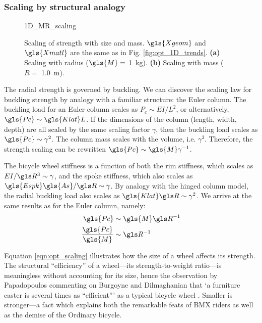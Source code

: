 \documentclass[\rootdir/thesis.tex]{subfiles}
\begin{document}
\subsubsection*{Scaling by structural analogy}

\begin{figure}
\centering
{1D_MR_scaling}
\caption[Scaling laws for radial strength]{Scaling of strength with size and mass. $\gls{Xgeom}$ and $\gls{Xmatl}$ are the same as in Fig. \ref{fig:opt_1D_trends}. \textbf{(a)} Scaling with radius ($\gls{M}=$ \SI{1}{kg}). \textbf{(b)} Scaling with mass ($R=$ \SI{1.0}{m}).}
\label{fig:opt_1D_scaling}
\end{figure}

The radial strength is governed by buckling. We can discover the scaling law for buckling strength by analogy with a familiar structure: the Euler column. The buckling load for an Euler column scales as $P_c \sim EI/L^2$, or alternatively, $\gls{Pc} \sim \gls{Klat} L$. If the dimensions of the column (length, width, depth) are all scaled by the same scaling factor $\gamma$, then the buckling load scales as $\gls{Pc} \sim \gamma^2$. The column mass scales with the volume, i.e. $\gamma^3$. Therefore, the strength scaling can be rewritten $\gls{Pc} \sim \gls{M} \gamma^{-1}$.

The bicycle wheel stiffness is a function of both the rim stiffness, which scales as $EI/\R^3 \sim \gamma$, and the spoke stiffness, which also scales as $\gls{Espk}\gls{As}/\R \sim \gamma$. By analogy with the hinged column model, the radial buckling load also scales as $\gls{Klat}\R \sim \gamma^2$. We arrive at the same results as for the Euler column, namely:
\begin{subequations}
\label{eqn:opt_scaling}
\begin{align}
\gls{Pc}                 & \sim \gls{M} \R^{-1}\\
\frac{\gls{Pc}}{\gls{M}} & \sim \R^{-1}
\end{align}
\end{subequations}

Equation \eqref{eqn:opt_scaling} illustrates how the size of a wheel affects its strength. The structural ``efficiency'' of a wheel---its strength-to-weight ratio---is meaningless without accounting for its size, hence the observation by Papadopoulos commenting on Burgoyne and Dilmaghanian \cite{Burgoyne1993} that `a furniture caster is several times as ``efficient''' as a typical bicycle wheel \cite{Papadopoulos1995}. Smaller is stronger---a fact which explains both the remarkable feats of BMX riders as well as the demise of the Ordinary bicycle.
\end{document}
